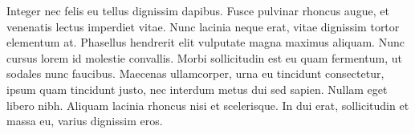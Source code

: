 Integer nec felis eu tellus dignissim dapibus. Fusce pulvinar rhoncus augue, et
venenatis lectus imperdiet vitae. Nunc lacinia neque erat, vitae dignissim
tortor elementum at. Phasellus hendrerit elit vulputate magna maximus aliquam.
Nunc cursus lorem id molestie convallis. Morbi sollicitudin est eu quam
fermentum, ut sodales nunc faucibus. Maecenas ullamcorper, urna eu tincidunt
consectetur, ipsum quam tincidunt justo, nec interdum metus dui sed sapien.
Nullam eget libero nibh. Aliquam lacinia rhoncus nisi et scelerisque. In dui
erat, sollicitudin et massa eu, varius dignissim eros.
